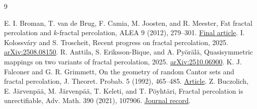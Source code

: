 \documentclass[11pt]{amsart}
\begin{document}
\begin{thebibliography}{9}
\raggedright
{} E. I. Broman, T. van de Brug, F. Camia, M. Joosten, and R. Meester, Fat fractal percolation and $k$-fractal percolation, ALEA 9 (2012), 279--301. \href{https://alea.math.cnrs.fr/articles/v9/09-12.pdf}{Final article}.
 I. Kolossv\'ary and S. Troscheit, Recent progress on fractal percolation, 2025. \href{https://arxiv.org/abs/2508.08150}{arXiv:2508.08150}.
 R. Anttila, S. Eriksson-Bique, and A. Py\"or\"al\"a, Quasisymmetric mappings on two variants of fractal percolation, 2025. \href{https://arxiv.org/abs/2510.06900}{arXiv:2510.06900}.
 K. J. Falconer and G. R. Grimmett, On the geometry of random Cantor sets and fractal percolation, J. Theoret. Probab. 5 (1992), 465--485. \href{https://www.statslab.cam.ac.uk/~grg1000/papers/jtp5-465.pdf}{Article}.
 Z. Buczolich, E. J\"arvenp\"a\"a, M. J\"arvenp\"a\"a, T. Keleti, and T. P\"oyht\"ari, Fractal percolation is unrectifiable, Adv. Math. 390 (2021), 107906. \href{https://doi.org/10.1016/j.aim.2021.107906}{Journal record}.
\end{thebibliography}
\end{document}
